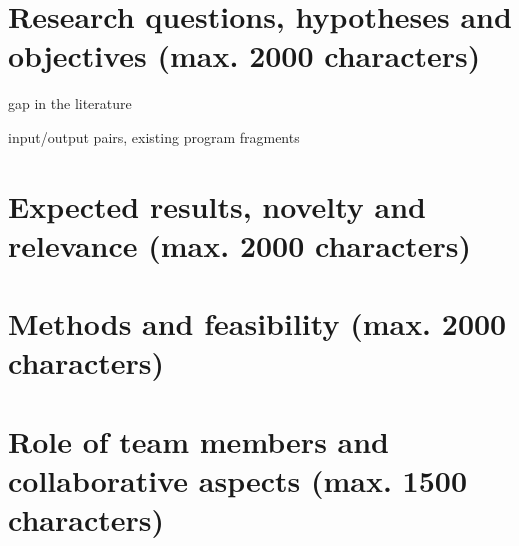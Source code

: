 \documentclass[a4paper,12pt]{article}
\begin{document}
\section{Research questions, hypotheses and objectives (max. 2000 characters)}

gap in the literature

input/output pairs, existing program fragments

\section{Expected results, novelty and relevance (max. 2000 characters)}

\section{Methods and feasibility (max. 2000 characters)}

\section{Role of team members and collaborative aspects (max. 1500 characters)}
\end{document}
